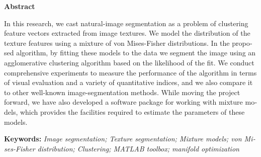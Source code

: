 \cleartoleftpage %
\thispagestyle{empty}
\begin{latin} %

\baselineskip=1.5cm
\parbox{\linewidth}{\centering \textbf{\Large{Abstract}}}
\noindent
In this research, we cast natural-image segmentation as a problem of clustering feature vectors extracted from image textures.
We model the distribution of the texture features using a mixture of von Mises-Fisher distributions.
In the proposed algorithm, by fitting these models to the data we segment the image using an agglomerative clustering algorithm based on the likelihood of the fit.
We conduct comprehensive experiments to measure the performance of the algorithm in terms of visual evaluation and a variety of quantitative indices, and we also compare it to other well-known image-segmentation methods.
While moving the project forward, we have also developed a software package for working with mixture models, which provides the facilities required to estimate the parameters of these models.

\vspace{1cm}
\noindent
\textbf{Keywords:} \textit{Image segmentation; Texture segmentation; Mixture models; von Mises-Fisher distribution; Clustering; MATLAB toolbox; manifold optimization}

\baselineskip=1cm

\end{latin}

